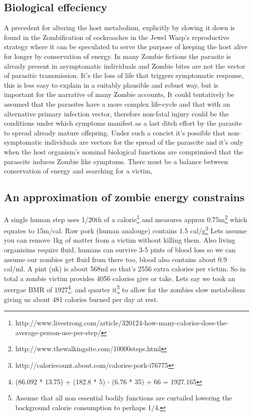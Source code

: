 \documentclass[a4paper,12pt]{article}
\begin{document}
\subsection{Biological effeciency}
A precedent for altering the host metabolism, explicitly by slowing it down is found in the Zombification of cockroaches in the Jewel Wasp's reproductive strategy where it can be speculated to serve the purpose of keeping the host alive for longer by conservation of energy.
In many Zombie fictions the parasite is already present in asymptomatic individuals and Zombie bites are not the vector of parasitic transmission. It's the loss of life that triggers symptomatic response, this is less easy to explain in a suitably plausible and robust way, but is important for the narrative of many Zombie accounts, It could tentatively be assumed that the parasites have a more complex life-cycle and that with an alternative primary infection vector, therefore non-fatal injury could be the conditions under which symptoms manifest as a last ditch effort by the parasite to spread already mature offspring.
Under such a conciet it's possible that non-symptomatic individuals are vectors for the spread of the parascite and it's only when the host organism's nominal biological functions are comprimised that the parascite induces Zombie like symptoms.
There must be a balance between conservation of energy and searching for a victim,
\subsection{An approximation of zombie energy constrains}
A single human step uses 1/20th of a calorie\footnote{http://www.livestrong.com/article/320124-how-many-calories-does-the-average-person-use-per-step/} and measures approx 0.75m\footnote{http://www.thewalkingsite.com/10000steps.html} 
which equates to 15m/cal. Raw pork (human analouge) contains 1.5 cal/g\footnote{http://caloriecount.about.com/calories-pork-i76775}
Lets assume you can remove 1kg of matter from a victim without killing them.
Also living organisims require fluid, humans can survive 3-5 pints of blood loss so we can assume our zombies get fluid from there too, blood also contains about 0.9 cal/ml.
A pint (uk) is about 568ml so that's 2556 extra calories per victim.
So in total a zombie victim provides 4056 calories give or take.
Lets say we took an avergae BMR of 1927\footnote{(86.092 * 13.75) + (182.8 * 5) - (6.76 * 35) + 66 = 1927.165}. and quarter it\footnote{Assume that all non essential bodily functions are curtailed lowering the background calorie consumption to perhaps 1/4.} to allow for the zombies slow metabolism giving us  
about 481 calories burned per day at rest.
\end{document}
